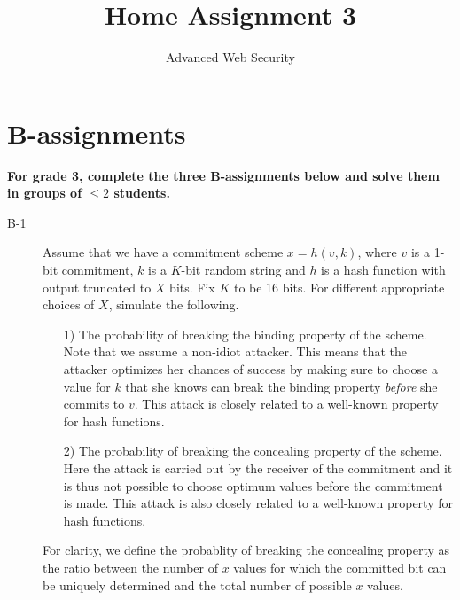 \documentclass{article}
\begin{document}
	
\title{Home Assignment 3}
\author{Advanced Web Security}
\date{\the\year}

\maketitle

\section*{B-assignments}
\textbf{For grade 3, complete the three B-assignments below and solve them in groups of $\leq 2$ students.}

\begin{description}
	\item[B-1]{Assume that we have a commitment scheme $x = h(v, k)$, where $v$ is a 1-bit commitment,
		$k$ is a $K$-bit random string and $h$ is a hash function with output truncated to $X$ bits.
		Fix $K$ to be 16 bits. For different appropriate choices of $X$, simulate the following.
		\begin{itemize}
			\item[1)] The probability of breaking the binding property of the scheme. Note that we assume a non-idiot attacker. This means that the attacker optimizes her chances of success by making sure to choose a value for $k$ that she knows can break the binding property \textit{before} she commits to $v$. This attack is closely related to a well-known property for hash functions.
			\item[2)] The probability of breaking the concealing property of the scheme. Here the attack is carried out by the receiver of the commitment and it is thus not possible to choose optimum values before the commitment is made. This attack is also closely related to a well-known property for hash functions.
		\end{itemize}
		For clarity, we define the probablity of breaking the concealing property as the ratio between the number of $x$ values for which the committed bit can be uniquely determined and the total number of possible $x$ values. 
		
}
\end{description}
\end{document}
